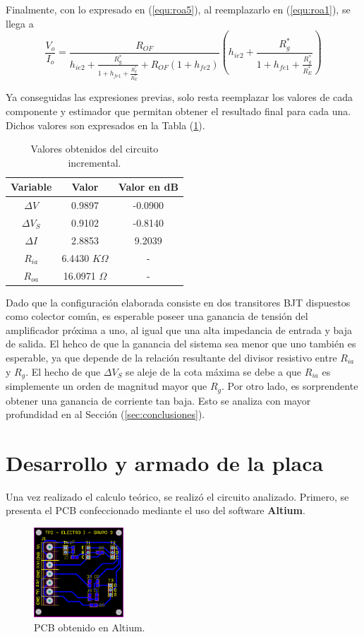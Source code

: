 Finalmente, con lo expresado en (\ref{equ:roa5}), al reemplazarlo en (\ref{equ:roa1}), se llega a
\begin{equation}
	\frac{V_o}{I_o} = \frac{R_{OF}}{h_{ie2} + \frac{R_{g}^{*}} {1 + h_{fe1} + \frac{R_{g}^{*}}{R_{E}^{*}}}  + R_{OF} \left( 1 + h_{fe2} \right)} \left( h_{ie2} + \frac{R_{g}^{*}} {1 + h_{fe1} + \frac{R_{g}^{*}}{R_{E}^{*}}}  \right)
	\label{equ:roa}
\end{equation}

Ya conseguidas las expresiones previas, solo resta reemplazar los valores de cada componente y estimador que permitan obtener el resultado final para cada una. Dichos valores son expresados en la Tabla (\ref{tab:resultados}).

\begin{table}[H]
\centering
\begin{tabular}{ccc}
\hline
\textbf{Variable} & \textbf{Valor} & \textbf{Valor en dB} \\
\hline
$\Delta V$ & 0.9897 & -0.0900 \\
$\Delta V_S$ & 0.9102 & -0.8140 \\
$\Delta I$ & 2.8853 & 9.2039 \\
$R_{ia}$ & 6.4430 $K\Omega$ & - \\
$R_{oa}$ & 16.0971 $\Omega$ & - \\
\hline
\end{tabular}
\caption{Valores obtenidos del circuito incremental.}
\label{tab:resultados}
\end{table}

Dado que la configuración elaborada consiste en dos transitores BJT dispuestos como colector común, es esperable poseer una ganancia de tensión del amplificador próxima a uno, al igual que una alta impedancia de entrada y baja de salida. El hehco de que la ganancia del sistema sea menor que uno también es esperable, ya que depende de la relación resultante del divisor resistivo entre $R_{ia}$ y $R_g$. El hecho de que $\Delta V_S$ se aleje de la cota máxima se debe a que $R_{ia}$ es simplemente un orden de magnitud mayor que $R_g$. Por otro lado, es sorprendente obtener una ganancia de corriente tan baja. Esto se analiza con mayor profundidad en al Sección (\ref{sec:conclusiones}).

\section{Desarrollo y armado de la placa}
Una vez realizado el calculo teórico, se realizó el circuito analizado. Primero, se presenta el PCB confeccionado mediante el uso del software \textbf{Altium}.
\begin{figure}[H]
\centering
	\includegraphics[width=0.3\textwidth]{Imagenes/PCB.png}
	\caption{PCB obtenido en Altium.}
\end{figure}

